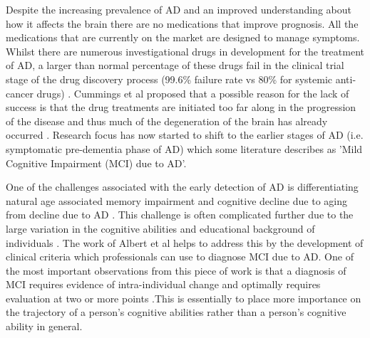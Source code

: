 \documentclass[12pt]{article}
\begin{document}
\par
Despite the increasing prevalence of AD and an improved understanding about how it affects the brain there are no medications that improve prognosis. All the medications that are currently on the market are designed to manage symptoms. Whilst there are numerous investigational drugs in development for the treatment of AD, a larger than normal percentage of these drugs fail in the clinical trial stage of the drug discovery process (99.6\% failure rate vs 80\% for systemic anti-cancer drugs) \cite{Cummings2014}. Cummings et al proposed that a possible reason for the lack of success is that the drug treatments are initiated too far along in the progression of the disease and thus much of the degeneration of the brain has already occurred \cite{Cummings2014}. Research focus has now started to shift to the earlier stages of AD (i.e. symptomatic pre-dementia phase of AD) which some literature describes as 'Mild Cognitive Impairment (MCI) due to AD'.
\par
One of the challenges associated with the early detection of AD is differentiating natural age associated memory impairment and cognitive decline due to aging from decline due to AD \cite{Lo2017}. This challenge is often complicated further due to the large variation in the cognitive abilities and educational background of individuals \cite{Harada2013}. The work of Albert et al helps to address this by the development of clinical criteria which professionals can use to diagnose MCI due to AD. One of the most important observations from this piece of work is that a diagnosis of MCI requires evidence of intra-individual change and optimally requires evaluation at two or more points \cite{Albert2011}.This is essentially to place more importance on the trajectory of a person's cognitive abilities rather than a person's cognitive ability in general. 
\end{document}
